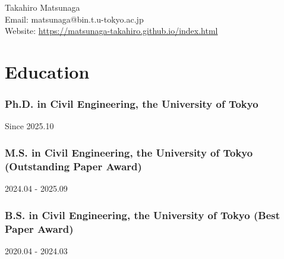 \documentclass[uplatex,a4paper,10pt,dvipdfmx]{jsarticle}
\begin{document}
\begin{center}
  {\LARGE Takahiro Matsunaga}\\[2mm] %
  \small Email: {matsunaga@bin.t.u-tokyo.ac.jp} \\ Website: \url{https://matsunaga-takahiro.github.io/index.html}
\end{center}

\section*{Education}
\subsubsection*{Ph.D. in Civil Engineering, the University of Tokyo}{Since 2025.10}
\subsubsection*{M.S. in Civil Engineering, the University of Tokyo (Outstanding Paper Award)}{2024.04 - 2025.09}
\subsubsection*{B.S. in Civil Engineering, the University of Tokyo (Best Paper Award)}{2020.04 - 2024.03}

\nocite{*}

\printbibliography[filter=journal, title={Journal Articles}]

\printbibliography[filter=conf-intl, title={International Conferences}]

\printbibliography[filter=conf-dom, title={Domestic Conferences}]

\printbibliography[filter=grant, title={Grants}]

\printbibliography[filter=award, title={Awards}]
\end{document}
